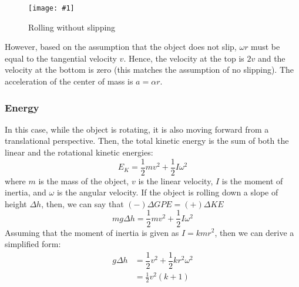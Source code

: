 \documentclass[a4paper,12pt]{article}
\newcommand{\img}[4]{\begin{center}
  \begin{figure}[H]
    \centering
    \texttt{[image: \#1]}
    \caption{#3}
    \label{fig:#4}
  \end{figure}
\end{center}}
\begin{document}
\img{rolling.png}{0.8}{Rolling without slipping}{rolling}

However, based on the assumption that the object does not slip, $\omega r$ must be equal to the tangential velocity $v$. Hence, the velocity at the top is $2v$ and the velocity at the bottom is zero (this matches the assumption of no slipping). The acceleration of the center of mass is $a = \alpha r$.

\subsubsection{Energy}

In this case, while the object is rotating, it is also moving forward from a translational perspective. Then, the total kinetic energy is the sum of both the linear and the rotational kinetic energies: $$E_K = \dfrac{1}{2}mv^2 + \dfrac{1}{2}I\omega^2$$where $m$ is the mass of the object, $v$ is the linear velocity, $I$ is the moment of inertia, and $\omega$ is the angular velocity.
If the object is rolling down a slope of height $\Delta h$, then, we can say that $(-)\Delta GPE = (+)\Delta KE$
$$mg\Delta h = \dfrac{1}{2}mv^2 + \dfrac{1}{2}I\omega^2$$
Assuming that the moment of inertia is given as $I = kmr^2$, then we can derive a simplified form:
\begin{align*}
  g\Delta h & = \dfrac{1}{2}v^2 + \dfrac{1}{2}kr^2\omega^2 \\
            & = \frac{1}{2}v^2(k + 1)
\end{align*}
\end{document}
